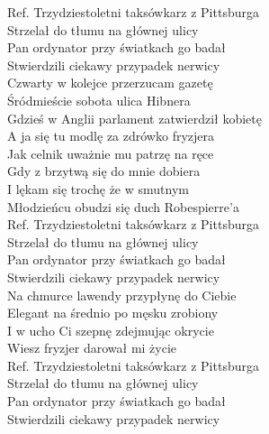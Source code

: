 
Ref. Trzydziestoletni taksówkarz z Pittsburga \tab{} \\
 Strzelał do tłumu na głównej ulicy \tab{} \\
 Pan ordynator przy światkach go badał \tab{}\\
 Stwierdzili ciekawy przypadek nerwicy \tab{}\\
\hops
Czwarty w kolejce przerzucam gazetę \tab{}\\
Śródmieście sobota ulica Hibnera \tab{}\\
Gdzieś w Anglii parlament zatwierdził kobietę \tab{}\\
A ja się tu modlę za zdrówko fryzjera \tab{} \\
Jak celnik uważnie mu patrzę na ręce \tab{} \\
Gdy z brzytwą się do mnie dobiera \tab{} \\
I lękam się trochę że w smutnym \tab{} \\
Młodzieńcu obudzi się duch Robespierre'a \tab{} \\
\hops
Ref. Trzydziestoletni taksówkarz z Pittsburga  \\
 Strzelał do tłumu na głównej ulicy  \\
 Pan ordynator przy światkach go badał \\
 Stwierdzili ciekawy przypadek nerwicy \\
\hops
Na chmurce lawendy przypłynę do Ciebie \\
Elegant na średnio po męsku zrobiony \\
I w ucho Ci szepnę zdejmując okrycie\\
Wiesz fryzjer darował mi życie\\
\hops
Ref. Trzydziestoletni taksówkarz z Pittsburga  \\
 Strzelał do tłumu na głównej ulicy  \\
 Pan ordynator przy światkach go badał \\
 Stwierdzili ciekawy przypadek nerwicy